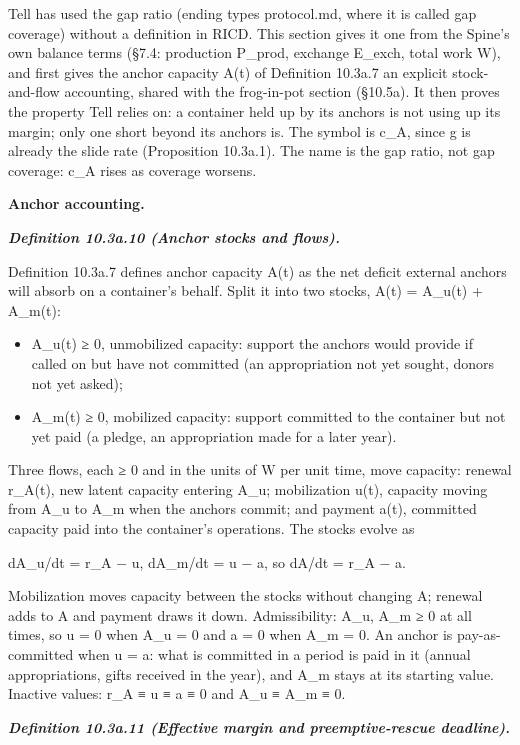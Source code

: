 \documentclass[
]{article}
\begin{document}
Tell has used the gap ratio (ending types protocol.md, where it is
called gap coverage) without a definition in RICD. This section gives it
one from the Spine's own balance terms (§7.4: production P\_prod,
exchange E\_exch, total work W), and first gives the anchor capacity
A(t) of Definition 10.3a.7 an explicit stock-and-flow accounting, shared
with the frog-in-pot section (§10.5a). It then proves the property Tell
relies on: a container held up by its anchors is not using up its
margin; only one short beyond its anchors is. The symbol is c\_A, since
g is already the slide rate (Proposition 10.3a.1). The name is the gap
ratio, not gap coverage: c\_A rises as coverage worsens.

\textbf{Anchor accounting.}

\emph{\textbf{Definition 10.3a.10 (Anchor stocks and flows).}}

Definition 10.3a.7 defines anchor capacity A(t) as the net deficit
external anchors will absorb on a container's behalf. Split it into two
stocks, A(t) = A\_u(t) + A\_m(t):

\begin{itemize}
\item
  A\_u(t) ≥ 0, unmobilized capacity: support the anchors would provide
  if called on but have not committed (an appropriation not yet sought,
  donors not yet asked);
\item
  A\_m(t) ≥ 0, mobilized capacity: support committed to the container
  but not yet paid (a pledge, an appropriation made for a later year).
\end{itemize}

Three flows, each ≥ 0 and in the units of W per unit time, move
capacity: renewal r\_A(t), new latent capacity entering A\_u;
mobilization u(t), capacity moving from A\_u to A\_m when the anchors
commit; and payment a(t), committed capacity paid into the container's
operations. The stocks evolve as

dA\_u/dt = r\_A − u, dA\_m/dt = u − a, so dA/dt = r\_A − a.

Mobilization moves capacity between the stocks without changing A;
renewal adds to A and payment draws it down. Admissibility: A\_u, A\_m ≥
0 at all times, so u = 0 when A\_u = 0 and a = 0 when A\_m = 0. An
anchor is pay-as-committed when u = a: what is committed in a period is
paid in it (annual appropriations, gifts received in the year), and A\_m
stays at its starting value. Inactive values: r\_A ≡ u ≡ a ≡ 0 and A\_u
≡ A\_m ≡ 0.

\emph{\textbf{Definition 10.3a.11 (Effective margin and
preemptive-rescue deadline).}}
\end{document}
